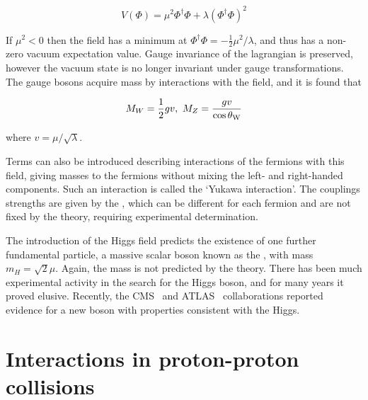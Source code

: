 \begin{equation}
V(\Phi) =  \mu^{2}\Phi^{\dagger}\Phi + \lambda(\Phi^{\dagger}\Phi)^{2}
\end{equation}

If $\mu^{2} < 0$ then the field has a minimum at $\Phi^{\dagger}\Phi = -
\frac{1}{2} \mu^{2}/\lambda$, and thus has a non-zero vacuum expectation value. 
Gauge invariance of the lagrangian is preserved, however the vacuum state is no
longer invariant under gauge transformations.
The gauge bosons acquire mass by interactions with the field, and it is found
that

\begin{equation}
M_{W} = \frac{1}{2}gv, \ M_{Z} = \frac{gv}{\cos{\ensuremath{\theta_{\mathrm{W}}}}}
\end{equation}

where $v = \mu / \sqrt{\lambda}$. 

Terms can also be
introduced describing interactions of the fermions with this field, giving
masses to the fermions without mixing the left- and right-handed components.
Such an interaction is called the `Yukawa interaction'. The couplings strengths
are given by the , which can be different for each
fermion and are not fixed by the theory, requiring experimental determination. 

The introduction of the Higgs field predicts the existence of one further
fundamental particle, a massive scalar boson known as the ,
with mass $m_{H} = \sqrt{2}\mu$. Again, the mass is not predicted by the theory. 
There has
been much experimental activity in the search for the Higgs boson, and for many
years it proved elusive. Recently,
the CMS~\cite{CMS_Higgs:2012gu} and ATLAS~\cite{ATLAS_Higgs:2012gk} collaborations reported evidence for a new boson with
properties consistent with the Higgs.

\section{Interactions in proton-proton collisions}
\label{sec:Theory-ppInteractions}

